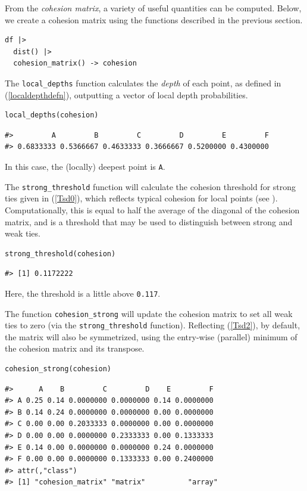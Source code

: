 From the \emph{cohesion matrix}, a variety of useful quantities can be computed. Below, we create a cohesion matrix using the functions described in the previous section.

\begin{verbatim}
df |>
  dist() |>
  cohesion_matrix() -> cohesion
\end{verbatim}

The \texttt{local\_depths} function calculates the \emph{depth} of each point, as defined in (\ref{localdepthdefn}), outputting a vector of local depth probabilities.

\begin{verbatim}
local_depths(cohesion)
\end{verbatim}

\begin{verbatim}
#>         A         B         C         D         E         F
#> 0.6833333 0.5366667 0.4633333 0.3666667 0.5200000 0.4300000
\end{verbatim}

\noindent In this case, the (locally) deepest point is \texttt{A}.

The \texttt{strong\_threshold} function will calculate the cohesion threshold for strong ties given in (\ref{Tsd0}), which reflects typical cohesion for local points (see \citet{berenhaut2022social}). Computationally, this is equal to half the average of the diagonal of the cohesion matrix, and is a threshold that may be used to distinguish between strong and weak ties.

\begin{verbatim}
strong_threshold(cohesion)
\end{verbatim}

\begin{verbatim}
#> [1] 0.1172222
\end{verbatim}

\noindent Here, the threshold is a little above \texttt{0.117}.

The function \texttt{cohesion\_strong} will update the cohesion matrix to set all weak ties to zero (via the \texttt{strong\_threshold} function). Reflecting (\ref{Tsd2}), by default, the matrix will also be symmetrized, using the entry-wise (parallel) minimum of the cohesion matrix and its transpose.

\begin{verbatim}
cohesion_strong(cohesion)
\end{verbatim}

\begin{verbatim}
#>      A    B         C         D    E         F
#> A 0.25 0.14 0.0000000 0.0000000 0.14 0.0000000
#> B 0.14 0.24 0.0000000 0.0000000 0.00 0.0000000
#> C 0.00 0.00 0.2033333 0.0000000 0.00 0.0000000
#> D 0.00 0.00 0.0000000 0.2333333 0.00 0.1333333
#> E 0.14 0.00 0.0000000 0.0000000 0.24 0.0000000
#> F 0.00 0.00 0.0000000 0.1333333 0.00 0.2400000
#> attr(,"class")
#> [1] "cohesion_matrix" "matrix"          "array"
\end{verbatim}

